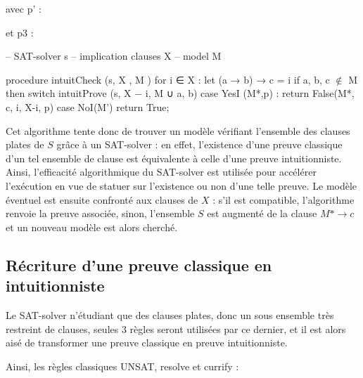 avec p' :
\begin{prooftree}
\end{prooftree}

et p3 :
\begin{prooftree}
\end{prooftree}



-- SAT-solver s
-- implication clauses X
-- model M

\begin{listing}[1]{1}
procedure intuitCheck (s, X , M )
    for i ∈ X :
        let (a → b) → c = i
        if a, b, c $\notin$ M then
            switch intuitProve (s, X − {i}, M ∪ {a}, b)
                case YesI (M*,p) :
                    return False(M*, c, i, X-{i}, p)
                case NoI(M')
                return True;
\end{listing}

Cet algorithme tente donc de trouver un mod\`ele v\'erifiant l'ensemble des clauses plates de $S$ gr\^ace \`a un SAT-solver : en effet, l'existence d'une preuve classique d'un tel ensemble de clause est \'equivalente \`a celle d'une preuve intuitionniste. Ainsi, l'efficacité algorithmique du SAT-solver est utilis\'ee pour acc\'el\'erer l'ex\'ecution en vue de statuer sur l'existence ou non d'une telle preuve. Le mod\`ele \'eventuel est ensuite confront\'e aux clauses de $X$ : s'il est compatible, l'algorithme renvoie la preuve associ\'ee, sinon, l'ensemble $S$ est augment\'e de la clause $M* \rightarrow c$ et un nouveau mod\`ele est alors cherch\'e.
                
\subsection{R\'ecriture d'une preuve classique en intuitionniste}

Le SAT-solver n'\'etudiant que des clauses plates, donc un sous ensemble tr\`es restreint de clauses, seules 3 r\`egles seront utilis\'ees par ce dernier, et il est alors ais\'e de transformer une preuve classique en preuve intuitionniste.

Ainsi, les r\`egles classiques UNSAT, resolve et currify :

\begin{prooftree}
\end{prooftree}

